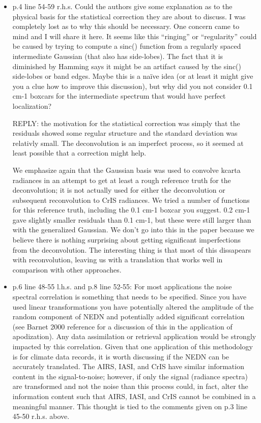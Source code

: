 \documentclass[11pt]{article}
\newcommand {\reply} {\mbox{\small REPLY}}
\begin{document}
\begin{itemize}
\item p.4 line 54-59 r.h.s. Could the authors give some explanation
  as to the physical basis for the statistical correction they are
  about to discuss. I was completely lost as to why this should be
  necessary. One concern came to mind and I will share it here. It
  seems like this ``ringing'' or ``regularity'' could be caused by
  trying to compute a sinc() function from a regularly spaced
  intermediate Gaussian (that also has side-lobes). The fact that it
  is diminished by Hamming says it might be an artifact caused by
  the sinc() side-lobes or band edges. Maybe this is a naïve idea
  (or at least it might give you a clue how to improve this
  discussion), but why did you not consider 0.1 cm-1 boxcars for the
  intermediate spectrum that would have perfect localization?

  \reply: the motivation for the statistical correction was simply
  that the residuals showed some regular structure and the standard
  deviation was relativly small.  The deconvolution is an imperfect
  process, so it seemed at least possible that a correction might
  help.

  We emphasize again that the Gaussian basis was used to convolve
  kcarta radiances in an attempt to get at least a rough reference
  truth for the deconvolution; it is not actually used for either
  the deconvolution or subsequent reconvolution to CrIS radiances.
  We tried a number of functions for this reference truth, including
  the 0.1 cm-1 boxcar you suggest.  0.2 cm-1 gave slightly smaller
  residuals than 0.1 cm-1, but these were still larger than with the
  generalized Gaussian.  We don't go into this in the paper because
  we believe there is nothing surprising about getting significant
  imperfections from the deconvolution.  The interesting thing is
  that most of this dissapears with reconvolution, leaving us with a
  translation that works well in comparison with other approaches.
  
\item p.6 line 48-55 l.h.s. and p.8 line 52-55: For most
  applications the noise spectral correlation is something that
  needs to be specified.  Since you have used linear transformations
  you have potentially altered the amplitude of the random component
  of NEDN and potentially added significant correlation (see Barnet
  2000 reference for a discussion of this in the application of
  apodization). Any data assimilation or retrieval application would
  be strongly impacted by this correlation. Given that one
  application of this methodology is for climate data records, it is
  worth discussing if the NEDN can be accurately translated.  The
  AIRS, IASI, and CrIS have similar information content in the
  signal-to-noise; however, if only the signal (radiance spectra)
  are transformed and not the noise than this process could, in
  fact, alter the information content such that AIRS, IASI, and CrIS
  cannot be combined in a meaningful manner. This thought is tied to
  the comments given on p.3 line 45-50 r.h.s. above.


\end{itemize}
\end{document}
